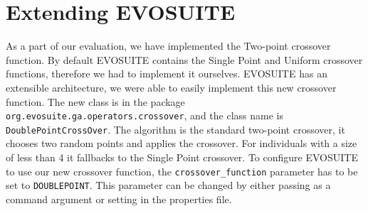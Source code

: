 \documentclass[sigconf]{acmart}
\begin{document}
\section{Extending EVOSUITE}
\label{estending}
As a part of our evaluation, we have implemented the Two-point crossover function. By default EVOSUITE
contains the Single Point and Uniform crossover functions, therefore we had to implement it ourselves.
EVOSUITE has an extensible architecture, we were able to easily implement this new crossover function.
The new class is in the package \verb|org.evosuite.ga.operators.crossover|, and the class name is
\verb|DoublePointCrossOver|. The algorithm is the standard two-point crossover, it chooses two random 
points and applies the crossover. For individuals with a size of less than 4 it fallbacks to 
the Single Point crossover. To configure EVOSUITE to use our new crossover function, 
the \verb|crossover_function| parameter has to be set to \verb|DOUBLEPOINT|.
This parameter can be changed by either passing as a command argument or setting in the properties file.
\end{document}
